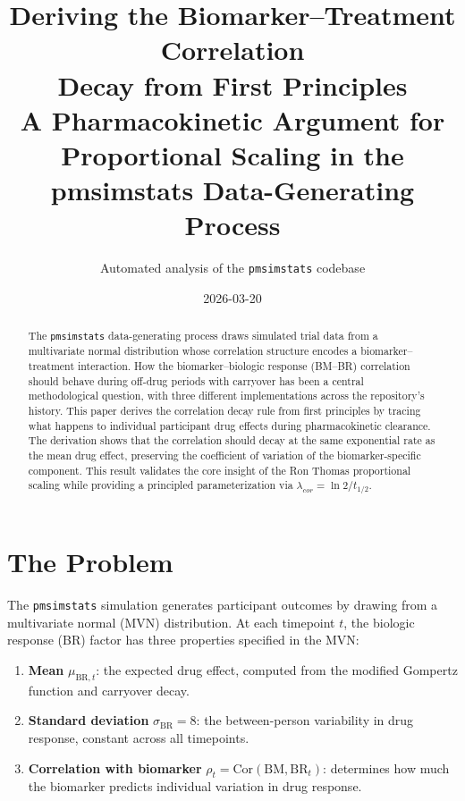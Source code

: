 \documentclass[11pt]{article}
\title{Deriving the Biomarker--Treatment Correlation\\
       Decay from First Principles\\[6pt]
       \large A Pharmacokinetic Argument for Proportional
       Scaling in the pmsimstats Data-Generating Process}
\author{Automated analysis of the \texttt{pmsimstats} codebase}
\date{2026-03-20}
\begin{document}
\maketitle
\thispagestyle{fancy}

\begin{abstract}
The \texttt{pmsimstats} data-generating process draws simulated
trial data from a multivariate normal distribution whose
correlation structure encodes a biomarker--treatment interaction.
How the biomarker--biologic response (BM--BR) correlation should
behave during off-drug periods with carryover has been a central
methodological question, with three different implementations
across the repository's history. This paper derives the
correlation decay rule from first principles by tracing what
happens to individual participant drug effects during
pharmacokinetic clearance. The derivation shows that the
correlation should decay at the same exponential rate as the
mean drug effect, preserving the coefficient of variation of
the biomarker-specific component. This result validates the
core insight of the Ron Thomas proportional scaling while
providing a principled parameterization via
$\lambda_{cor} = \ln 2 / t_{1/2}$.
\end{abstract}

\tableofcontents
\newpage

\section{The Problem}

The \texttt{pmsimstats} simulation generates participant outcomes
by drawing from a multivariate normal (MVN) distribution. At each
timepoint $t$, the biologic response (BR) factor has three
properties specified in the MVN:

\begin{enumerate}
\item \textbf{Mean} $\mu_{\text{BR},t}$: the expected drug
  effect, computed from the modified Gompertz function and
  carryover decay.
\item \textbf{Standard deviation} $\sigma_{\text{BR}} = 8$:
  the between-person variability in drug response, constant
  across all timepoints.
\item \textbf{Correlation with biomarker}
  $\rho_t = \text{Cor}(\text{BM}, \text{BR}_t)$: determines
  how much the biomarker predicts individual variation in
  drug response.
\end{enumerate}
\end{document}
